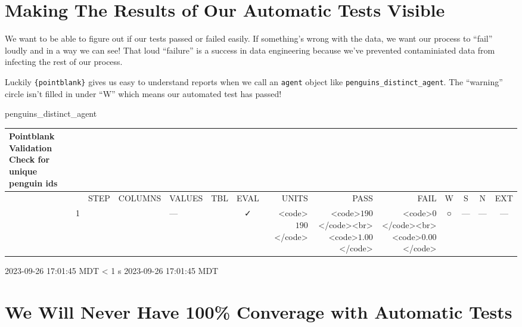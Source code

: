 \documentclass[
  letterpaper,
  DIV=11,
  numbers=noendperiod]{scrreprt}
\newenvironment{Shaded}{\begin{snugshade}}{\end{snugshade}}
\newcommand{\NormalTok}[1]{\textcolor[rgb]{0.00,0.23,0.31}{#1}}
\begin{document}
\hypertarget{making-the-results-of-our-automatic-tests-visible}{%
\section{Making The Results of Our Automatic Tests
Visible}\label{making-the-results-of-our-automatic-tests-visible}}

We want to be able to figure out if our tests passed or failed easily.
If something's wrong with the data, we want our process to ``fail''
loudly and in a way we can see! That loud ``failure'' is a success in
data engineering because we've prevented contaminiated data from
infecting the rest of our process.

Luckily \texttt{\{pointblank\}} gives us easy to understand reports when
we call an \texttt{agent} object like
\texttt{penguins\_distinct\_agent}. The ``warning'' circle isn't filled
in under ``W'' which means our automated test has passed!

\begin{Shaded}
\begin{Highlighting}[]
\NormalTok{penguins\_distinct\_agent}
\end{Highlighting}
\end{Shaded}

\setlength{\LTpost}{0mm}
\begin{longtable}{lrlllccrrrcccc}
\caption*{
{\large Pointblank Validation} \\ 
{\small Check for unique penguin ids}
} \\ 
\toprule
 &  & STEP & COLUMNS & VALUES & TBL & EVAL & UNITS & PASS & FAIL & W & S & N & EXT \\ 
\midrule
 & 1 &  &  & — &                                                              & ✓ & <code>$190$</code> & <code>$190$</code><br><code>$1.00$</code> & <code>$0$</code><br><code>$0.00$</code> & ○ & --- & --- & --- \\ 
\bottomrule
\end{longtable}
\begin{minipage}{\linewidth}
2023-09-26 17:01:45 MDT
\textless{} 1 s
2023-09-26 17:01:45 MDT\\
\end{minipage}

\hypertarget{we-will-never-have-100-converage-with-automatic-tests}{%
\section{We Will Never Have 100\% Converage with Automatic
Tests}\label{we-will-never-have-100-converage-with-automatic-tests}}
\end{document}
